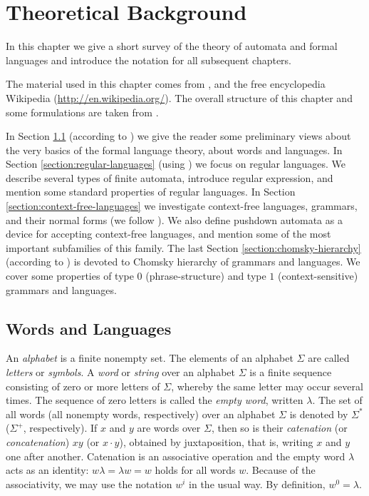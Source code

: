 \chapter{Theoretical Background}
\label{chapter:background}

In this chapter we give a short survey of the theory of automata and formal languages and introduce the notation for all subsequent chapters.

The material used in this chapter comes from \cite{RozSal97I, HopcroftMotwaniUllman07}, and the free encyclopedia Wikipedia (\url{http://en.wikipedia.org/}). The overall structure of this chapter and some formulations are taken from \cite{C10Diploma}.

In Section \ref{section:words-and-languages} (according to \cite{MaSa1997formal}) we give the reader some preliminary views about the very basics of the formal language theory, about words and languages. In Section \ref{section:regular-languages} (using \cite{Sh1997regular}) we focus on regular languages. We describe several types of finite automata, introduce regular expression, and mention some standard properties of regular languages. In Section \ref{section:context-free-languages} we investigate context-free languages, grammars, and their normal forms (we follow \cite{AuBeBo1997context-free}). We also define pushdown automata as a device for accepting context-free languages, and mention some of the most important subfamilies of this family. The last Section \ref{section:chomsky-hierarchy} (according to \cite{MaSa1997aspects}) is devoted to Chomsky hierarchy of grammars and languages. We cover some properties  of type $0$ (phrase-structure) and type $1$ (context-sensitive) grammars and languages.

\section{Words and Languages}
\label{section:words-and-languages}

An \emph{alphabet} is a finite nonempty set. The elements of an alphabet $\Sigma$ are called \emph{letters} or \emph{symbols}. A \emph{word} or \emph{string} over an alphabet $\Sigma$ is a finite sequence consisting of zero or more letters of $\Sigma$, whereby the same letter may occur several times. The sequence of zero letters is called the  \emph{empty word}, written $\lambda$. The set of all words (all nonempty words, respectively) over an alphabet $\Sigma$ is denoted by $\Sigma^*$ ($\Sigma^+$, respectively). If $x$ and $y$ are words over $\Sigma$, then so is their \emph{catenation} (or \emph{concatenation}) $xy$ (or $x \cdot y$), obtained by juxtaposition, that is, writing $x$ and $y$ one after another. Catenation is an associative operation and the empty word $\lambda$ acts as an identity: $w \lambda = \lambda w = w$ holds for all words $w$. Because of the associativity, we may use the notation $w^i$ in the usual way. By definition, $w^0 = \lambda$.

